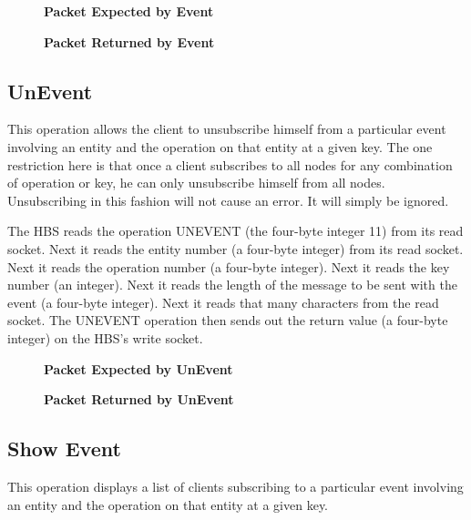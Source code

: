\begin{figure}[htb]
  \centerline{}
  \caption{{\bf Packet Expected by Event}}
  \label{fig:Event1}
\end{figure}

\begin{figure}[htb]
  \centerline{}
  \caption{{\bf Packet Returned by Event}}
  \label{fig:Event2}
\end{figure}

\newpage
\subsection{UnEvent}

This operation allows the client to unsubscribe himself from a particular
event involving an entity and the operation on that entity at a given key.
The one restriction here is that once a client subscribes to all nodes for
any combination of operation or key, he can only unsubscribe himself from
all nodes.  Unsubscribing in this fashion will not cause an error.  It will
simply be ignored.  

The HBS reads the operation UNEVENT (the four-byte integer 11) from its
read socket.  Next it reads the entity number (a four-byte integer) from
its read socket.  Next it reads the operation number (a four-byte integer).
Next it reads the key number (an integer).  Next it reads the length
of the message to be sent with the event (a four-byte integer).  Next it
reads that many characters from the read socket.  The UNEVENT operation
then sends out the return value (a four-byte integer) on the HBS's write
socket.

\begin{figure}[htb]
  \centerline{}
  \caption{{\bf Packet Expected by UnEvent}}
  \label{fig:UnEvent1}
\end{figure}

\begin{figure}[htb]
  \centerline{}
  \caption{{\bf Packet Returned by UnEvent}}
  \label{fig:UnEvent2}
\end{figure}

\newpage
\subsection{Show Event}

This operation displays a list of clients subscribing to a particular event
involving an entity and the operation on that entity at a given key.  

